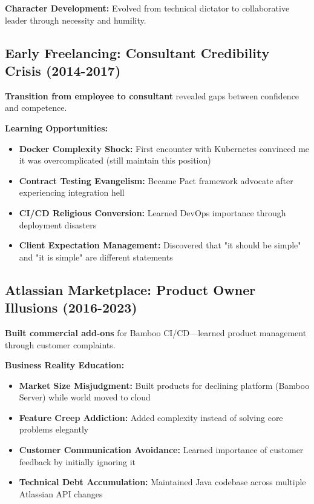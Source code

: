 \documentclass[10pt,a4paper]{article}
\begin{document}
\textbf{Character Development:} Evolved from technical dictator to collaborative leader through necessity and humility.

\subsection{Early Freelancing: Consultant Credibility Crisis (2014-2017)}

\textbf{Transition from employee to consultant} revealed gaps between confidence and competence.

\textbf{Learning Opportunities:}
\begin{itemize}
\item \textbf{Docker Complexity Shock:} First encounter with Kubernetes convinced me it was overcomplicated (still maintain this position)
\item \textbf{Contract Testing Evangelism:} Became Pact framework advocate after experiencing integration hell
\item \textbf{CI/CD Religious Conversion:} Learned DevOps importance through deployment disasters
\item \textbf{Client Expectation Management:} Discovered that "it should be simple" and "it is simple" are different statements
\end{itemize}

\subsection{Atlassian Marketplace: Product Owner Illusions (2016-2023)}

\textbf{Built commercial add-ons} for Bamboo CI/CD—learned product management through customer complaints.

\textbf{Business Reality Education:}
\begin{itemize}
\item \textbf{Market Size Misjudgment:} Built products for declining platform (Bamboo Server) while world moved to cloud
\item \textbf{Feature Creep Addiction:} Added complexity instead of solving core problems elegantly
\item \textbf{Customer Communication Avoidance:} Learned importance of customer feedback by initially ignoring it
\item \textbf{Technical Debt Accumulation:} Maintained Java codebase across multiple Atlassian API changes
\end{itemize}
\end{document}

